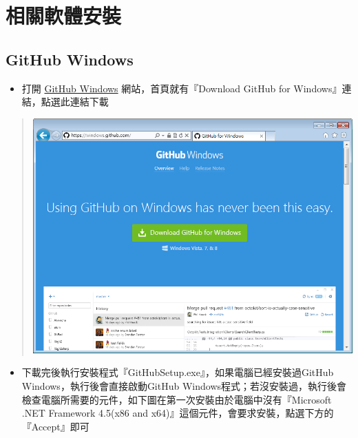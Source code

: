 \documentclass[letterpaper,10pt,english]{sphinxmanual}
\begin{document}
\section{相關軟體安裝}
\label{_doc/writing/index-github:id5}

\subsection{GitHub Windows}
\label{_doc/writing/index-github:id6}\begin{itemize}
\item {} 
打開 \href{https://windows.github.com/}{GitHub Windows} 網站，首頁就有『Download GitHub for Windows』連結，點選此連結下載

\end{itemize}
\begin{quote}

{\hfill\includegraphics{GitHub-Install-001.png}\hfill}
\end{quote}
\begin{itemize}
\item {} 
下載完後執行安裝程式『GitHubSetup.exe』，如果電腦已經安裝過GitHub Windows，執行後會直接啟動GitHub Windows程式；若沒安裝過，執行後會檢查電腦所需要的元件，如下圖在第一次安裝由於電腦中沒有『Microsoft .NET Framework 4.5(x86 and x64)』這個元件，會要求安裝，點選下方的『Accept』即可

\end{itemize}
\end{document}
